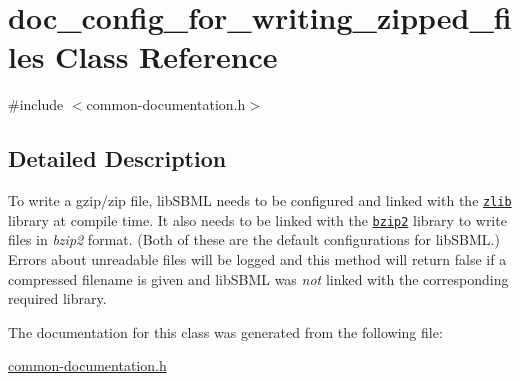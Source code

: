 \hypertarget{classdoc__config__for__writing__zipped__files}{}\section{doc\+\_\+config\+\_\+for\+\_\+writing\+\_\+zipped\+\_\+files Class Reference}
\label{classdoc__config__for__writing__zipped__files}


{\ttfamily \#include $<$common-\/documentation.\+h$>$}



\subsection{Detailed Description}
\begin{DoxyParagraph}{}
To write a gzip/zip file, lib\+S\+B\+ML needs to be configured and linked with the \href{http://www.zlib.net/}{\tt zlib} library at compile time. It also needs to be linked with the \href{}{\tt bzip2} library to write files in {\itshape bzip2} format. (Both of these are the default configurations for lib\+S\+B\+ML.) Errors about unreadable files will be logged and this method will return {\ttfamily false} if a compressed filename is given and lib\+S\+B\+ML was {\itshape not} linked with the corresponding required library. 
\end{DoxyParagraph}


The documentation for this class was generated from the following file\+:\begin{DoxyCompactItemize}
\item 
\hyperlink{common-documentation_8h}{common-\/documentation.\+h}\end{DoxyCompactItemize}

